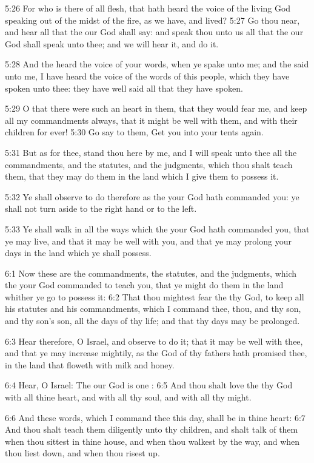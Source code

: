 5:26 For who is there of all flesh, that hath heard the voice of the living God speaking out of the midst of the fire, as we have, and lived?  5:27 Go thou near, and hear all that the \LORD our God shall say: and speak thou unto us all that the \LORD our God shall speak unto thee; and we will hear it, and do it.

5:28 And the \LORD heard the voice of your words, when ye spake unto me; and the \LORD said unto me, I have heard the voice of the words of this people, which they have spoken unto thee: they have well said all that they have spoken.

5:29 O that there were such an heart in them, that they would fear me, and keep all my commandments always, that it might be well with them, and with their children for ever!  5:30 Go say to them, Get you into your tents again.

5:31 But as for thee, stand thou here by me, and I will speak unto thee all the commandments, and the statutes, and the judgments, which thou shalt teach them, that they may do them in the land which I give them to possess it.

5:32 Ye shall observe to do therefore as the \LORD your God hath commanded you: ye shall not turn aside to the right hand or to the left.

5:33 Ye shall walk in all the ways which the \LORD your God hath commanded you, that ye may live, and that it may be well with you, and that ye may prolong your days in the land which ye shall possess.

6:1 Now these are the commandments, the statutes, and the judgments, which the \LORD your God commanded to teach you, that ye might do them in the land whither ye go to possess it: 6:2 That thou mightest fear the \LORD thy God, to keep all his statutes and his commandments, which I command thee, thou, and thy son, and thy son's son, all the days of thy life; and that thy days may be prolonged.

6:3 Hear therefore, O Israel, and observe to do it; that it may be well with thee, and that ye may increase mightily, as the \LORD God of thy fathers hath promised thee, in the land that floweth with milk and honey.

6:4 Hear, O Israel: The \LORD our God is one \LORD: 6:5 And thou shalt love the \LORD thy God with all thine heart, and with all thy soul, and with all thy might.

6:6 And these words, which I command thee this day, shall be in thine heart: 6:7 And thou shalt teach them diligently unto thy children, and shalt talk of them when thou sittest in thine house, and when thou walkest by the way, and when thou liest down, and when thou risest up.

